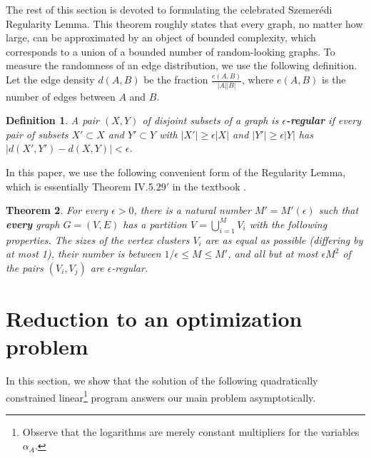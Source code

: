 \documentclass[11pt]{article}
\newtheorem{theorem}{Theorem}[section]
\newtheorem{definition}[theorem]{Definition}
\begin{document}
The rest of this section is devoted to formulating
the celebrated Szemer\'edi Regularity Lemma.  This theorem roughly
states that every graph, no matter how large, can be approximated by
an object of bounded complexity, which corresponds to a union of a
bounded number of random-looking graphs.  To measure the randomness of
an edge distribution, we use the following definition.  Let the edge
density $d(A, B)$ be the fraction $\frac{e(A, B)}{|A| |B|}$, where
$e(A, B)$ is the number of edges between $A$ and $B$.

\begin{definition}
  A pair $(X, Y)$ of disjoint subsets of a graph is
  \textbf{$\epsilon$-regular} if every pair of subsets $X' \subset X$
  and $Y' \subset Y$ with $|X'| \geq \epsilon |X|$ and $|Y'| \geq
  \epsilon |Y|$ has $|d(X', Y') - d(X, Y)| < \epsilon$.
\end{definition}

In this paper, we use the following convenient form of the Regularity
Lemma, which is essentially Theorem IV.5.$29'$ in the textbook
\cite{B-modern-graph-theory}.

\begin{theorem}
  \label{thm:regularity-lemma} For every $\epsilon > 0$, there is a
  natural number $M' = M'(\epsilon)$ such that \textbf{every} graph $G
  = (V, E)$ has a partition $V = \bigcup_{i=1}^M V_i$ with the
  following properties.  The sizes of the vertex clusters $V_i$ are as
  equal as possible (differing by at most 1), their number is between
  $1/\epsilon \leq M \leq M'$, and all but at most $\epsilon M^2$ of
  the pairs $(V_i, V_j)$ are $\epsilon$-regular.
\end{theorem}




\section{Reduction to an optimization problem}
\label{sec:reduction-to-opt}

In this section, we show that the solution of the following
quadratically constrained linear\footnote{Observe that the logarithms
  are merely constant multipliers for the variables $\alpha_A$.}
program answers our main problem asymptotically.

\vspace{3mm}
\end{document}
